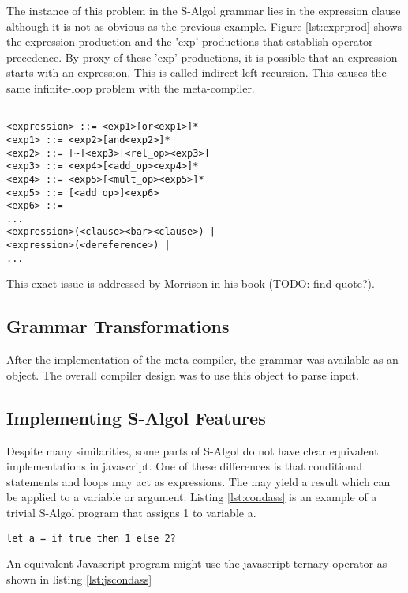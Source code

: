 \documentclass{article}
\begin{document}
The instance of this problem in the S-Algol grammar lies in the expression clause although it is not as obvious as the previous example. Figure \ref{lst:exprprod} shows the expression production and the 'exp' productions that establish operator precedence. By proxy of these 'exp' productions, it is possible that an expression starts with an expression. This is called indirect left recursion. This causes the same infinite-loop problem with the meta-compiler. 

\begin{lstlisting}[caption={Left recursion in expressions},label={lst:exprprod}]
      
<expression> ::= <exp1>[or<exp1>]*
<exp1> ::= <exp2>[and<exp2>]*
<exp2> ::= [~]<exp3>[<rel_op><exp3>]
<exp3> ::= <exp4>[<add_op><exp4>]*
<exp4> ::= <exp5>[<mult_op><exp5>]*
<exp5> ::= [<add_op>]<exp6>
<exp6> ::= 
...
<expression>(<clause><bar><clause>) |
<expression>(<dereference>) | 
...
\end{lstlisting}

This exact issue is addressed by Morrison in his book (TODO: find quote?). 


\subsection{Grammar Transformations}

After the implementation of the meta-compiler, the grammar was available as an object. The overall compiler design was to use this object to parse input. 

\subsection{Implementing S-Algol Features}

Despite many similarities, some parts of S-Algol do not have clear equivalent implementations in javascript. One of these differences is that conditional statements and loops may act as expressions. The may yield a result which can be applied to a variable or argument. Listing \ref{lst:condass} is an example of a trivial S-Algol program that assigns 1 to variable a.

\begin{lstlisting}[caption={S-Algol conditional assignment},label={lst:condass}]
let a = if true then 1 else 2?
\end{lstlisting}

An equivalent Javascript program might use the javascript ternary operator as shown in listing \ref{lst:jscondass}
\end{document}

